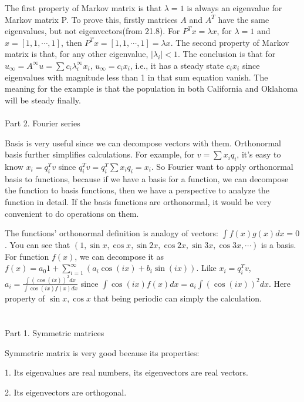 \documentclass{article}
\begin{document}
\begin{spacing}{1.5}
The first property of Markov matrix is that $\lambda=1$ is always an eigenvalue for Markov matrix P. To prove this, firstly matrices $A$ and $A^T$ have the same eigenvalues, but not eigenvectors(from 21.8). For $P^Tx=\lambda x$, for $\lambda=1$ and $x=[1, 1, \cdots, 1]$, then $P^Tx=[1, 1, \cdots, 1]=\lambda x$. The second property of Markov matrix is that, for any other eigenvalue, $|\lambda_i| < 1$. The conclusion is that for $u_{\infty}=A^{\infty}u=\sum c_i \lambda_i^{\infty}x_i$, $u_{\infty}=c_ix_i$, i.e., it has a steady state $c_ix_i$ since eigenvalues with magnitude less than 1 in that sum equation vanish. The meaning for the example is that the population in both California and Oklahoma will be steady finally.
\\\\ Part 2. Fourier series

Basis is very useful since we can decompose vectors with them. Orthonormal basis further simplifies calculations. For example, for $v=\sum x_i q_i$, it's easy to know $x_i=q_i^Tv$ since $q_i^T v = q_i^T \sum x_i q_i = x_i$. So Fourier want to apply orthonormal basis to functions, because if we have a basis for a function, we can decompose the function to basis functions, then we have a perspective to analyze the function in detail. If the basis functions are orthonormal, it would be very convenient to do operations on them. 

The functions' orthonormal definition is analogy of vectors: $\int f(x)g(x)dx = 0$. You can see that $(1, \sin x, \cos x, \sin 2x, \cos 2x, \sin 3x, \cos 3x, \cdots)$ is a basis. For function $f(x)$, we can decompose it as $f(x)=a_0 1 + \sum_{i=1}^{\infty} (a_i \cos (ix)+b_i \sin (ix))$. Like $x_i=q_i^Tv$, $a_i=\frac{\int (\cos(ix))^2dx}{\int\cos(ix)f(x)dx}$ since $\int\cos(ix)f(x)dx=a_i\int (\cos(ix))^2dx$. Here property of $\sin x, \cos x$ that being periodic can simply the calculation.


\section{}
Part 1. Symmetric matrices

Symmetric matrix is very good because its properties:

\hspace*{0.5cm}1. Its eigenvalues are real numbers, its eigenvectors are real vectors.

\hspace*{0.5cm}2. Its eigenvectors are orthogonal.


\end{spacing}
\end{document}
